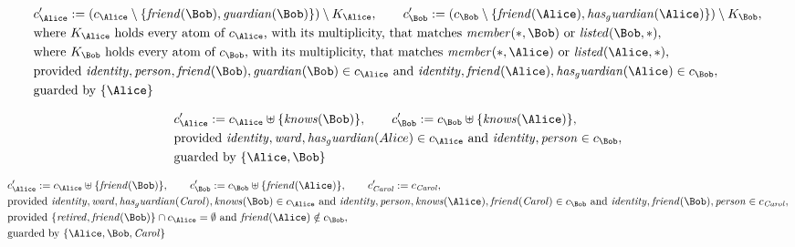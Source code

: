\begin{align*}
&
c'_
{
\Alice
}
 := 
(c_
{
\Alice
}
 \setminus 
\{
\mathit{
friend
}
(
\Bob
)
,
\mathit{
guardian
}
(
\Bob
)
\}
) \setminus K_
{
\Alice
}
, \qquad 
c'_
{
\Bob
}
 := 
(c_
{
\Bob
}
 \setminus 
\{
\mathit{
friend
}
(
\Alice
)
,
\mathit{
has_guardian
}
(
\Alice
)
\}
) \setminus K_
{
\Bob
}
,\\
&
\text{where } K_
{
\Alice
}
 \text{ holds every atom of } c_
{
\Alice
}
 \text{, with its multiplicity, that matches } 
\mathit{
member
}
(
\ast
,
\Bob
)
 \text{ or } 
\mathit{
listed
}
(
\Bob
,
\ast
)
,\\
&
\text{where } K_
{
\Bob
}
 \text{ holds every atom of } c_
{
\Bob
}
 \text{, with its multiplicity, that matches } 
\mathit{
member
}
(
\ast
,
\Alice
)
 \text{ or } 
\mathit{
listed
}
(
\Alice
,
\ast
)
,\\
&
\text{provided } 
\mathit{
identity
}
,
\mathit{
person
}
,
\mathit{
friend
}
(
\Bob
)
,
\mathit{
guardian
}
(
\Bob
)
 \in c_
{
\Alice
}
 \text{ and } 
\mathit{
identity
}
,
\mathit{
friend
}
(
\Alice
)
,
\mathit{
has_guardian
}
(
\Alice
)
 \in c_
{
\Bob
}
,\\
&
\text{guarded by } \{
\Alice
\}
\end{align*}

\begin{align*}
&
c'_
{
\Alice
}
 := 
c_
{
\Alice
}
 \uplus 
\{
\mathit{
knows
}
(
\Bob
)
\}
, \qquad 
c'_
{
\Bob
}
 := 
c_
{
\Bob
}
 \uplus 
\{
\mathit{
knows
}
(
\Alice
)
\}
,\\
&
\text{provided } 
\mathit{
identity
}
,
\mathit{
ward
}
,
\mathit{
has_guardian
}
(
Alice
)
 \in c_
{
\Alice
}
 \text{ and } 
\mathit{
identity
}
,
\mathit{
person
}
 \in c_
{
\Bob
}
,\\
&
\text{guarded by } \{
\Alice
,
\Bob
\}
\end{align*}

\begin{align*}
&
c'_
{
\Alice
}
 := 
c_
{
\Alice
}
 \uplus 
\{
\mathit{
friend
}
(
\Bob
)
\}
, \qquad 
c'_
{
\Bob
}
 := 
c_
{
\Bob
}
 \uplus 
\{
\mathit{
friend
}
(
\Alice
)
\}
, \qquad 
c'_
{
\mathit{Carol}
}
 := 
c_
{
\mathit{Carol}
}
,\\
&
\text{provided } 
\mathit{
identity
}
,
\mathit{
ward
}
,
\mathit{
has_guardian
}
(
\mathit{Carol}
)
,
\mathit{
knows
}
(
\Bob
)
 \in c_
{
\Alice
}
 \text{ and } 
\mathit{
identity
}
,
\mathit{
person
}
,
\mathit{
knows
}
(
\Alice
)
,
\mathit{
friend
}
(
\mathit{Carol}
)
 \in c_
{
\Bob
}
 \text{ and } 
\mathit{
identity
}
,
\mathit{
friend
}
(
\Bob
)
,
\mathit{
person
}
 \in c_
{
\mathit{Carol}
}
,\\
&
\text{provided } 
\{
\mathit{
retired
}
,
\mathit{
friend
}
(
\Bob
)
\}
 \cap c_
{
\Alice
}
 = \emptyset
 \text{ and } 
\mathit{
friend
}
(
\Alice
)
 \notin c_
{
\Bob
}
,\\
&
\text{guarded by } \{
\Alice
,
\Bob
,
\mathit{Carol}
\}
\end{align*}
